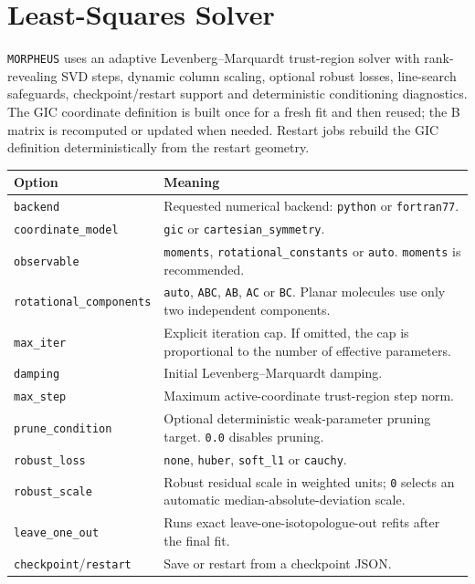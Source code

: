 \documentclass[11pt]{article}
\newcommand{\program}{\texttt{MORPHEUS}}
\begin{document}
\section{Least-Squares Solver}

\program{} uses an adaptive Levenberg--Marquardt trust-region solver with
rank-revealing SVD steps, dynamic column scaling, optional robust losses,
line-search safeguards, checkpoint/restart support and deterministic
conditioning diagnostics.  The GIC coordinate definition is built once for a
fresh fit and then reused; the B matrix is recomputed or updated when needed.
Restart jobs rebuild the GIC definition deterministically from the restart
geometry.

\begin{longtable}{@{}p{}p{}@{}}
\toprule
Option & Meaning \\
\midrule
\endhead
\texttt{backend} & Requested numerical backend: \texttt{python} or
\texttt{fortran77}. \\
\texttt{coordinate\_model} & \texttt{gic} or
\texttt{cartesian\_symmetry}. \\
\texttt{observable} & \texttt{moments}, \texttt{rotational\_constants} or
\texttt{auto}.  \texttt{moments} is recommended. \\
\texttt{rotational\_components} & \texttt{auto}, \texttt{ABC},
\texttt{AB}, \texttt{AC} or \texttt{BC}.  Planar molecules use only two
independent components. \\
\texttt{max\_iter} & Explicit iteration cap.  If omitted, the cap is
proportional to the number of effective parameters. \\
\texttt{damping} & Initial Levenberg--Marquardt damping. \\
\texttt{max\_step} & Maximum active-coordinate trust-region step norm. \\
\texttt{prune\_condition} & Optional deterministic weak-parameter pruning
target.  \texttt{0.0} disables pruning. \\
\texttt{robust\_loss} & \texttt{none}, \texttt{huber},
\texttt{soft\_l1} or \texttt{cauchy}. \\
\texttt{robust\_scale} & Robust residual scale in weighted units; \texttt{0}
selects an automatic median-absolute-deviation scale. \\
\texttt{leave\_one\_out} & Runs exact leave-one-isotopologue-out refits after
the final fit. \\
\texttt{checkpoint}/\texttt{restart} & Save or restart from a checkpoint JSON.\\
\bottomrule
\end{longtable}
\end{document}
